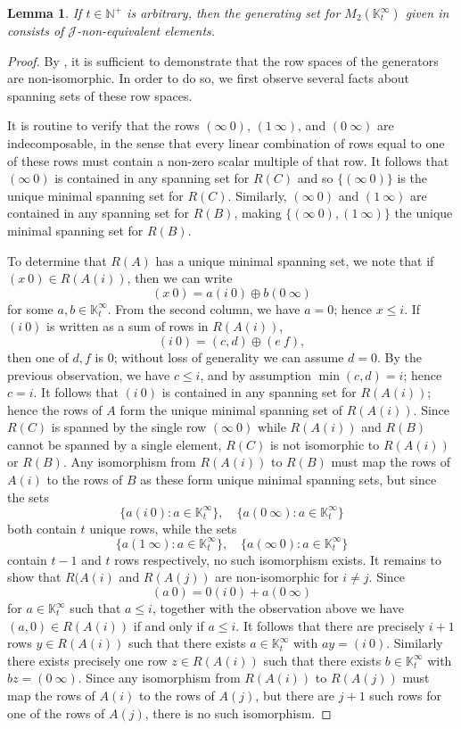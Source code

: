 \documentclass[11pt]{article}
\newtheorem{lemma}[thm]{Lemma}
\numberwithin{equation}{section}
\newcommand{\set}[2]{\ensuremath{\{#1 : #2 \}}}
\newcommand{\J}{\mathscr{J}}
\newcommand{\N}{\mathbb{N}}
\newcommand{\Np}{\N^{+}}
\newcommand{\K}{\mathbb{K}}
\newcommand{\Kmint}{\K^{\infty}_t}
\newcommand{\COMMA}{,\quad}
\begin{document}
\begin{lemma}
  If $t \in \Np$ is arbitrary, then the generating set for $M_2(\Kmint)$ given
  in  consists of
  $\J$-non-equivalent elements.
\end{lemma}
\begin{proof}
  By , it is sufficient to
  demonstrate that the row spaces of the generators are non-isomorphic. In order
  to do so, we first observe several facts about spanning sets of these row
  spaces.

  It is routine to verify that the rows $(\infty~0)$, $(1~\infty)$, and
  $(0~\infty)$ are indecomposable, in the sense that every linear combination of
  rows equal to one of these rows must contain a non-zero scalar multiple of
  that row. It follows that $(\infty~0)$ is contained in any spanning set for
  $R(C)$ and so $\{(\infty~0)\}$ is the unique minimal spanning set for $R(C)$.
  Similarly, $(\infty~0)$ and $(1~\infty)$ are contained in any spanning set for
  $R(B)$, making $\{(\infty~0), (1~\infty)\}$ the unique minimal spanning set
  for $R(B)$.

  To determine that $R(A)$ has a unique minimal spanning set, we note that if
  $(x~0) \in R(A(i))$, then we can write 
  \[(x~0) = a(i~0) \oplus b(0~\infty) \]
  for some $a, b \in \Kmint$. From the second column, we have $a = 0$;
  hence $x \leq i$. If $(i~0)$ is written as a sum of rows in $R(A(i))$,
  \[(i~0) = (c, d) \oplus (e~f),\]
  then one of $d, f$ is $0$; without loss of generality we can assume $d = 0$.
  By the previous observation, we have $c \leq i$, and by assumption $\min(c, d)
  = i$; hence $c = i$. It follows that $(i~0)$ is contained in any spanning
  set for $R(A(i))$; hence the rows of $A$ form the unique minimal spanning 
  set of $R(A(i))$.
  Since $R(C)$ is spanned by the single row $(\infty~0)$ while $R(A(i))$ and
  $R(B)$ cannot be spanned by a single element, $R(C)$ is not isomorphic
  to $R(A(i))$ or $R(B)$. Any isomorphism from $R(A(i))$ to $R(B)$ must map the
  rows of $A(i)$ to the rows of $B$ as these form unique minimal spanning sets,
  but since the sets
  \[\set{a(i~0)}{a \in \Kmint} \COMMA
    \set{a(0~\infty)}{a \in \Kmint}
  \]
  both contain $t$ unique rows, while the sets 
  \[
    \set{a(1~\infty)}{a \in \Kmint}\COMMA
    \set{a(\infty~0)}{a \in \Kmint}
  \]
  contain $t - 1$ and $t$ rows respectively, no such isomorphism exists.
  It remains to show that $R(A(i)$ and $R(A(j))$ are non-isomorphic for $i \neq
  j$. Since
  \[(a~0) = 0(i~0) + a(0~\infty)\]
  for $a \in \Kmint$ such that $a \leq i$, together with the observation
  above we have $(a, 0) \in R(A(i))$ if and only if $a \leq i$. It follows that
  there are precisely $i + 1$ rows $y \in R(A(i))$ such that there exists $a \in
  \Kmint$ with $ay = (i~0)$. Similarly there exists precisely one row $z
  \in R(A(i))$ such that there exists $b \in \Kmint$ with $bz = (0~\infty)$.
  Since any isomorphism from $R(A(i))$ to $R(A(j))$ must map the rows of $A(i)$
  to the rows of $A(j)$, but there are $j + 1$ such rows for one of the rows of
  $A(j)$, there is no such isomorphism.
\end{proof}
\end{document}
